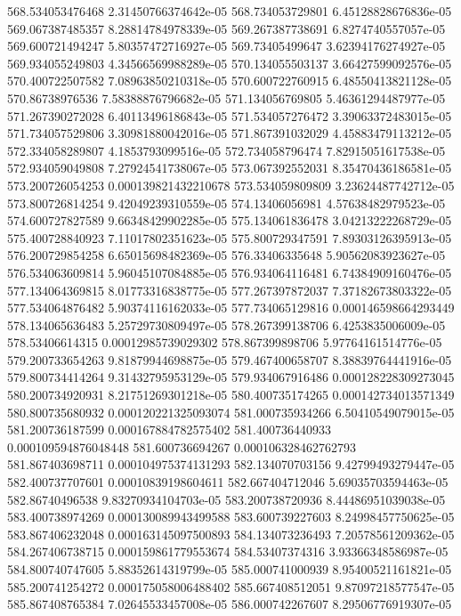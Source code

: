 {568.534053476468 2.31450766374642e-05
568.734053729801 6.45128828676836e-05
569.067387485357 8.28814784978339e-05
569.267387738691 6.8274740557057e-05
569.600721494247 5.80357472716927e-05
569.73405499647 3.62394176274927e-05
569.934055249803 4.34566569988289e-05
570.134055503137 3.66427599092576e-05
570.400722507582 7.08963850210318e-05
570.600722760915 6.48550413821128e-05
570.86738976536 7.58388876796682e-05
571.134056769805 5.46361294487977e-05
571.267390272028 6.40113496186843e-05
571.534057276472 3.39063372483015e-05
571.734057529806 3.30981880042016e-05
571.867391032029 4.45883479113212e-05
572.334058289807 4.1853793099516e-05
572.734058796474 7.82915051617538e-05
572.934059049808 7.27924541738067e-05
573.067392552031 8.35470436186581e-05
573.200726054253 0.000139821432210678
573.534059809809 3.23624487742712e-05
573.800726814254 9.42049239310559e-05
574.13406056981 4.57638482979523e-05
574.600727827589 9.66348429902285e-05
575.134061836478 3.04213222268729e-05
575.400728840923 7.11017802351623e-05
575.800729347591 7.89303126395913e-05
576.200729854258 6.65015698482369e-05
576.33406335648 5.90562083923627e-05
576.534063609814 5.96045107084885e-05
576.934064116481 6.74384909160476e-05
577.134064369815 8.01773316838775e-05
577.267397872037 7.37182673803322e-05
577.534064876482 5.90374116162033e-05
577.734065129816 0.000146598664293449
578.134065636483 5.25729730809497e-05
578.267399138706 6.4253835006009e-05
578.53406614315 0.00012985739029302
578.867399898706 5.97764161514776e-05
579.200733654263 9.81879944698875e-05
579.467400658707 8.38839764441916e-05
579.800734414264 9.31432795953129e-05
579.934067916486 0.000128228309273045
580.200734920931 8.21751269301218e-05
580.400735174265 0.000142734013571349
580.800735680932 0.000120221325093074
581.000735934266 6.50410549079015e-05
581.200736187599 0.000167884782575402
581.400736440933 0.000109594876048448
581.600736694267 0.000106328462762793
581.867403698711 0.000104975374131293
582.134070703156 9.42799493279447e-05
582.400737707601 0.00010839198604611
582.667404712046 5.69035703594463e-05
582.86740496538 9.83270934104703e-05
583.200738720936 8.44486951039038e-05
583.400738974269 0.000130089943499588
583.600739227603 8.24998457750625e-05
583.867406232048 0.000163145097500893
584.134073236493 7.20578561209362e-05
584.267406738715 0.000159861779553674
584.53407374316 3.93366348586987e-05
584.800740747605 5.88352614319799e-05
585.000741000939 8.95400521161821e-05
585.200741254272 0.000175058006488402
585.667408512051 9.87097218577547e-05
585.867408765384 7.02645533457008e-05
586.000742267607 8.29506776919307e-05
}
